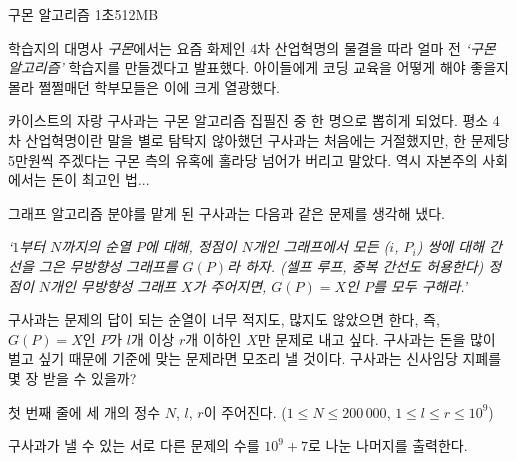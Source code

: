 \begin{problem}{구몬 알고리즘}
{}{}
{1초}{512MB}{}

학습지의 대명사 \textit{구몬}에서는 요즘 화제인 4차 산업혁명의 물결을 따라 얼마 전 \textit{`구몬 알고리즘'} 학습지를 만들겠다고 발표했다. 아이들에게 코딩 교육을 어떻게 해야 좋을지 몰라 쩔쩔매던 학부모들은 이에 크게 열광했다.

카이스트의 자랑 구사과는 구몬 알고리즘 집필진 중 한 명으로 뽑히게 되었다. 평소 4차 산업혁명이란 말을 별로 탐탁지 않아했던 구사과는 처음에는 거절했지만, 한 문제당 5만원씩 주겠다는 구몬 측의 유혹에 홀라당 넘어가 버리고 말았다. 역시 자본주의 사회에서는 돈이 최고인 법...

그래프 알고리즘 분야를 맡게 된 구사과는 다음과 같은 문제를 생각해 냈다.

\textit{`$1$부터 $N$까지의 순열 $P$에 대해, 정점이 $N$개인 그래프에서 모든 ($i$, $P_i$) 쌍에 대해 간선을 그은 무방향성 그래프를 $G(P)$라 하자. (셀프 루프, 중복 간선도 허용한다) 정점이 $N$개인 무방향성 그래프 $X$가 주어지면, $G(P)=X$인 $P$를 모두 구해라.'}

구사과는 문제의 답이 되는 순열이 너무 적지도, 많지도 않았으면 한다, 즉, $G(P)=X$인 $P$가 $l$개 이상 $r$개 이하인 $X$만 문제로 내고 싶다. 구사과는 돈을 많이 벌고 싶기 때문에 기준에 맞는 문제라면 모조리 낼 것이다. 구사과는 신사임당 지폐를 몇 장 받을 수 있을까?

\InputFile

첫 번째 줄에 세 개의 정수 $N$, $l$, $r$이 주어진다. ($1 \le N \le 200\, 000$, $1 \le l \le r \le 10^9$)

\OutputFile

구사과가 낼 수 있는 서로 다른 문제의 수를 $10^9+7$로 나눈 나머지를 출력한다.

\Examples
	
\begin{example}
%
%
%
\end{example}

\blankpage

\end{problem}
